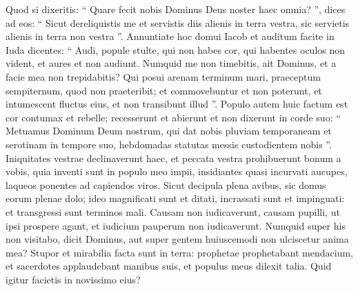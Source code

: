 \begin{biblechapter}
\begin{biblechapter}
\begin{biblechapter}
\begin{biblechapter}
\begin{biblechapter}
 \verse Quod si dixeritis: “ Quare fecit nobis Dominus Deus noster haec omnia? ”, dices ad eos: “ Sicut dereliquistis me et servistis diis alienis in terra vestra, sic servietis alienis in terra non vestra ”.
 \verse Annuntiate hoc domui Iacob
 et auditum facite in Iuda dicentes:
 \verse “ Audi, popule stulte, qui non habes cor,
 qui habentes oculos non vident,
 et aures et non audiunt.
 \verse Numquid me non timebitis,
 ait Dominus,
 et a facie mea non trepidabitis?
 Qui posui arenam terminum mari, praeceptum sempiternum, quod non praeteribit;
 et commovebuntur et non poterunt,
 et intumescent fluctus eius, et non transibunt illud ”.
 \verse Populo autem huic factum est cor contumax et rebelle;
 recesserunt et abierunt
 \verse et non dixerunt in corde suo:
 “ Metuamus Dominum Deum nostrum,
 qui dat nobis pluviam
 temporaneam et serotinam in tempore suo,
 hebdomadas statutas messis
 custodientem nobis ”.
 \verse Iniquitates vestrae declinaverunt haec,
 et peccata vestra prohibuerunt bonum a vobis,
 \verse quia inventi sunt in populo meo impii,
 insidiantes quasi incurvati aucupes,
 laqueos ponentes ad capiendos viros.
 \verse Sicut decipula plena avibus,
 sic domus eorum plenae dolo;
 ideo magnificati sunt et ditati,
 \verse incrassati sunt et impinguati:
 et transgressi sunt terminos mali.
 Causam non iudicaverunt,
 causam pupilli, ut ipsi prospere agant,
 et iudicium pauperum non iudicaverunt.
 \verse Numquid super his non visitabo,
 dicit Dominus,
 aut super gentem huiuscemodi
 non ulciscetur anima mea?
 \verse Stupor et mirabilia
 facta sunt in terra:
 \verse prophetae prophetabant mendacium,
 et sacerdotes applaudebant manibus suis,
 et populus meus dilexit talia.
 Quid igitur facietis in novissimo eius?
 

\end{biblechapter}
\end{biblechapter}
\end{biblechapter}
\end{biblechapter}
\end{biblechapter}
